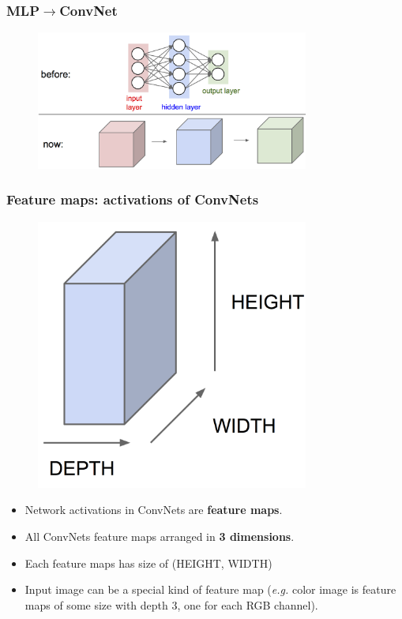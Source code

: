 \documentclass{beamer}
\begin{document}
\begin{frame}
  \frametitle{MLP$\rightarrow$ConvNet}

  \begin{figure}[!htm]
    \centering
    \includegraphics[width=0.8\textwidth]{convnet_gist.png}
  \end{figure}
\end{frame}

\begin{frame}
  \frametitle{Feature maps: activations of ConvNets}

  \begin{minipage}{0.48\textwidth}
    \begin{figure}[!htm]
      \includegraphics[width=0.8\textwidth]{feature_maps.png}
    \end{figure}
  \end{minipage}
  \begin{minipage}{0.48\textwidth}
    \begin{itemize}
      \item Network activations in ConvNets are \textbf{feature maps}.
      \item All ConvNets feature maps arranged in \textbf{3 dimensions}.
      \item Each feature maps has size of (HEIGHT, WIDTH)
      \item Input image can be a special kind of feature map (\emph{e.g.} color image is feature maps of some size with depth 3, one for each RGB channel).
    \end{itemize}
  \end{minipage}
\end{frame}
\end{document}
